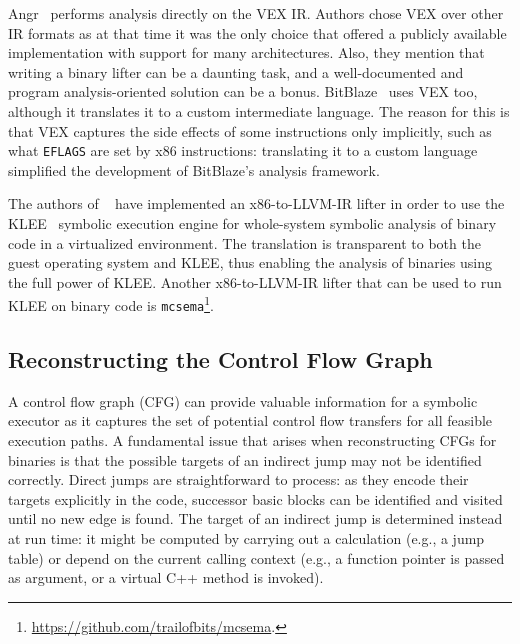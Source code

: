 {\sc Angr}~\cite{ANGR-SSP16} performs analysis directly on the VEX IR. Authors chose VEX over other IR formats as at that time it was the only choice that offered a publicly available implementation with support for many architectures. Also, they mention that writing a binary lifter can be a daunting task, and a well-documented and program analysis-oriented solution can be a bonus. {\sc BitBlaze}~\cite{BITBLAZE-ICISS08} uses VEX too, although it translates it to a custom intermediate language. The reason for this is that VEX captures the side effects of some instructions only implicitly, such as what {\tt EFLAGS} are set by x86 instructions: translating it to a custom language simplified the development of {\sc BitBlaze}'s analysis framework.

The authors of {\sc \stwoe}~\cite{CKC-TOCS12} have implemented an x86-to-LLVM-IR lifter in order to use the {\sc KLEE}~\cite{KLEE-OSDI08} symbolic execution engine for whole-system symbolic analysis of binary code in a virtualized environment. The translation is transparent to both the guest operating system and KLEE, thus enabling the analysis of binaries using the full power of {\sc KLEE}. Another x86-to-LLVM-IR lifter that can be used to run {\sc KLEE} on binary code is {\tt mcsema}\footnote{\url{https://github.com/trailofbits/mcsema}.}.

\subsection{Reconstructing the Control Flow Graph}

A control flow graph (CFG) can provide valuable information for a symbolic executor as it captures the set of potential control flow transfers for all feasible execution paths. A fundamental issue that arises when reconstructing CFGs for binaries is that the possible targets of an indirect jump may not be identified correctly. Direct jumps are straightforward to process: as they encode their targets explicitly in the code, successor basic blocks can be identified and visited until no new edge is found. The target of an indirect jump is determined instead at run time: it might be computed by carrying out a calculation (e.g., a jump table) or depend on the current calling context (e.g., a function pointer is passed as argument, or a virtual C++ method is invoked). %

